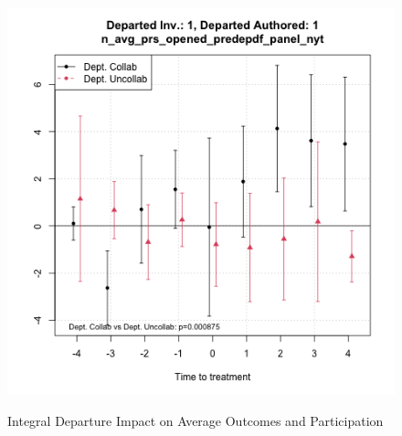 \begin{figure}[htbp]
\begin{minipage}[b]{0.49\textwidth}
    \label{fig:impact_avg_prs_opened_nondep}
    \end{minipage}
    \hfill
    \begin{minipage}[b]{0.49\textwidth}
        \centering
        \includegraphics[width=\textwidth]{temp/output/collab_imp/auth1_inv1_cs_norm_n_avg_prs_opened_predep.png}
    \label{fig:impact_avg_prs_opened_predep}

    \end{minipage}
    \caption{Integral Departure Impact on Average Outcomes and Participation}
\end{figure}
